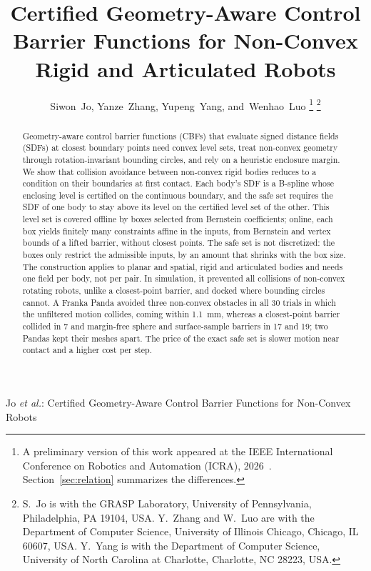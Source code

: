\documentclass[journal]{IEEEtran}
\theoremstyle{definition}
\newif\ifanonymous
\begin{document}
\title{Certified Geometry-Aware Control Barrier Functions for Non-Convex Rigid and Articulated
Robots}

\ifanonymous
\author{Anonymous Authors}
\markboth{IEEE Transactions on Robotics}%
{Certified Geometry-Aware Control Barrier Functions for Non-Convex Robots}
\else
\author{Siwon~Jo, Yanze~Zhang, Yupeng~Yang, and~Wenhao~Luo%
\thanks{A preliminary version of this work appeared at the IEEE International Conference on
Robotics and Automation (ICRA), 2026~\cite{jo2026geometry}. Section~\ref{sec:relation}
summarizes the differences.}%
\thanks{S.~Jo is with the GRASP Laboratory, University of Pennsylvania, Philadelphia, PA 19104,
USA. Y.~Zhang and W.~Luo are with the Department of Computer Science, University of Illinois
Chicago, Chicago, IL 60607, USA. Y.~Yang is with the Department of Computer Science, University
of North Carolina at Charlotte, Charlotte, NC 28223, USA.}}

%
{Jo \MakeLowercase{\textit{et al.}}: Certified Geometry-Aware Control Barrier Functions for Non-Convex Robots}
\fi

\maketitle

\begin{abstract}
Geometry-aware control barrier functions (CBFs) that evaluate signed distance fields (SDFs) at
closest boundary points need convex level sets, treat non-convex geometry through rotation-invariant
bounding circles, and rely on a heuristic enclosure margin. We show that collision avoidance between
non-convex rigid bodies reduces to a condition on their boundaries at first contact. Each body's SDF
is a B-spline whose enclosing level is certified on the continuous boundary, and the safe set
requires the SDF of one body to stay above its level on the certified level set of the other. This
level set is covered offline by boxes selected from Bernstein coefficients; online, each box yields
finitely many constraints affine in the inputs, from Bernstein and vertex bounds of a lifted barrier,
without closest points. The safe set is not discretized: the boxes only restrict the admissible
inputs, by an amount that shrinks with the box size. The construction applies to planar and
spatial, rigid and articulated bodies and needs one field per body, not per pair. In simulation, it
prevented all collisions of non-convex rotating robots, unlike a closest-point barrier, and docked
where bounding circles cannot. A Franka
Panda avoided three non-convex obstacles in all 30 trials in which the unfiltered motion collides,
coming within 1.1~mm, whereas a closest-point barrier collided in 7 and margin-free sphere and
surface-sample barriers in 17 and 19; two Pandas kept their meshes apart. The price of the exact
safe set is slower motion near contact and a higher cost per step.
\end{abstract}
\end{document}
